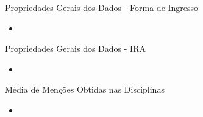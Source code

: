 \begin{frame}{Propriedades Gerais dos Dados - Forma de Ingresso}
    \begin{itemize}[itemsep=3ex]
        \item <gráfico mostrando forma de ingresso>
    \end{itemize}
\end{frame}

\begin{frame}{Propriedades Gerais dos Dados - IRA}
    \begin{itemize}[itemsep=3ex]
        \item <histograma mostrando ira>
    \end{itemize}
\end{frame}

\begin{frame}{Média de Menções Obtidas nas Disciplinas}
    \begin{itemize}[itemsep=3ex]
        \item <histograma mostrando menções obtidas>
    \end{itemize}
\end{frame}


